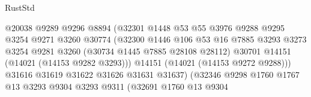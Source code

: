 \begin{lexlean}{RustStd}
\begin{coremodule}
                                          @20038
                                          @9289
                                          @9296
                                          @8894
                                          (@32301
                                            @1448
                                            @53
                                            @55
                                            @3976
                                            @9288
                                            @9295
                                            @3254
                                            @9271
                                            @3260
                                            @30774
                                            (@32300
                                              @1446
                                              @106
                                              @53
                                              @16
                                              @7885
                                              @3293
                                              @3273
                                              @3254
                                              @9281
                                              @3260
                                              (@30734 @1445 @7885 @28108 @28112)
                                              @30701
                                              @14151
                                              (@14021 (@14153 @9282 @3293)))
                                            @14151
                                            (@14021 (@14153 @9272 @9288)))
                                          @31616
                                          @31619
                                          @31622
                                          @31626
                                          @31631
                                          @31637)
                                        (@32346
                                          @9298
                                          @1760
                                          @1767
                                          @13
                                          @3293
                                          @9304
                                          @3293
                                          @9311
                                          (@32691
                                            @1760
                                            @13
                                            @9304

\end{coremodule}
\end{lexlean}
